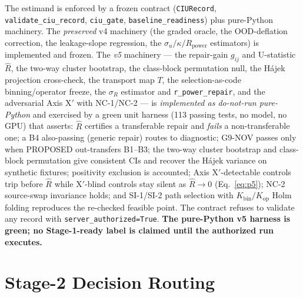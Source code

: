 \documentclass[11pt]{article}
\theoremstyle{plain}
\theoremstyle{definition}
\newcommand{\Rhat}{\widehat{R}}
\newcommand{\sR}{\sigma_{R}}
\newcommand{\sU}{\sigma_{u}}
\begin{document}
The estimand is enforced by a frozen contract (\texttt{CIURecord},
\texttt{validate\_ciu\_record}, \texttt{ciu\_gate}, \texttt{baseline\_readiness})
plus pure-Python machinery. The \emph{preserved} v4 machinery (the graded oracle, the
OOD-deflation correction, the leakage-slope regression, the $\sU/\kappa/R_{\mathrm{power}}$
estimators) is implemented and frozen. The \emph{v5} machinery --- the repair-gain
$g_{ij}$ and U-statistic $\Rhat$, the two-way cluster bootstrap, the class-block
permutation null, the H\'ajek projection cross-check, the transport map $T$, the
selection-as-code binning/operator freeze, the $\sR$ estimator and
\texttt{r\_power\_repair}, and the adversarial Axis X$'$ with NC-1/NC-2 --- is
\emph{implemented as do-not-run pure-Python} and exercised by a green unit
harness (113 passing tests, no model, no GPU) that asserts: $\Rhat$ certifies a
transferable repair and
\emph{fails} a non-transferable one; a B4 also-passing (generic repair) routes to
\textsf{diagnostic}; G9-NOV passes only when PROPOSED out-transfers B1--B3; the
two-way cluster bootstrap and class-block permutation give consistent CIs and recover
the H\'ajek variance on synthetic fixtures; positivity exclusion is accounted; Axis
X$'$-detectable controls trip before $\Rhat$ while X$'$-blind controls stay silent as
$\Rhat\to0$ (Eq.~\ref{eq:p5}); NC-2 source-swap invariance holds; and SI-1/SI-2 path
selection with $K_{\mathrm{bin}}/K_{\mathrm{op}}$ Holm folding reproduces the
re-checked feasible point. The contract refuses to validate any record with
\texttt{server\_authorized=True}. \textbf{The pure-Python v5 harness is green; no
Stage-1-ready label is claimed until the authorized run executes.}

\section{Stage-2 Decision Routing}\label{sec:routing}
\end{document}
